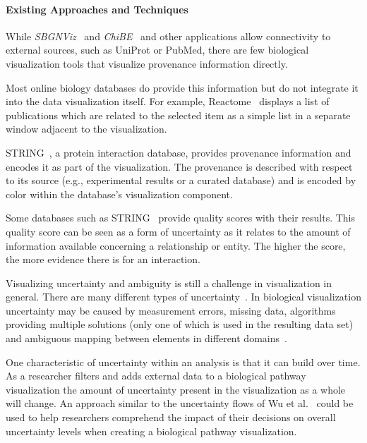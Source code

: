 \documentclass[twocolumn]{bmcart}%
\begin{document}
\paragraph*{Existing Approaches and Techniques}

While \textit{SBGNViz}~\cite{SBGNViz2015} and \textit{ChiBE}~\cite{Babur2010chibe} and other applications allow connectivity to external sources, such as UniProt or PubMed, there are few biological visualization tools that visualize provenance information directly.

Most online biology databases do provide this information but do not integrate it into the data visualization itself.
For example, Reactome~\cite{croft2014reactome} displays a list of publications which are related to the selected item as a simple list in a separate window adjacent to the visualization.

STRING~\cite{STRING2005}, a protein interaction database, provides provenance information and encodes it as part of the visualization.
The provenance is described with respect to its source (e.g., experimental results or a curated database) and is encoded by color within the database's visualization component.

Some databases such as STRING~\cite{STRING2005} provide quality scores with their results.
This quality score can be seen as a form of uncertainty as it relates to the amount of information available concerning a relationship or entity.
The higher the score, the more evidence there is for an interaction.

Visualizing uncertainty and ambiguity is still a challenge in visualization in general.
There are many different types of uncertainty~\cite{skeels2010uncertainty}.
In biological visualization uncertainty may be caused by measurement errors, missing data, algorithms providing multiple solutions (only one of which is used in the resulting data set) and ambiguous mapping between elements in different domains~\cite{kohlbacher2014multivariate}.

One characteristic of uncertainty within an analysis is that it can build over time.
As a researcher filters and adds external data to a biological pathway visualization the amount of uncertainty present in the visualization as a whole will change.
An approach similar to the uncertainty flows of Wu et al.~\cite{wu2012uncertainty} could be used to help researchers comprehend the impact of their decisions on overall uncertainty levels when creating a biological pathway visualization.
\end{document}

